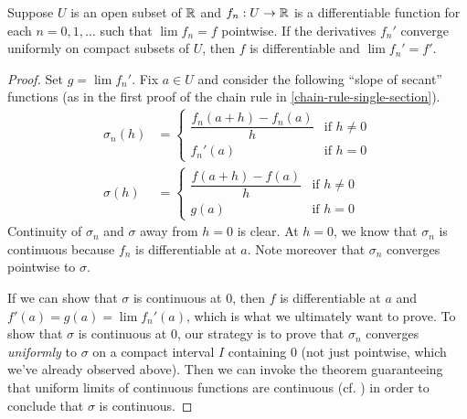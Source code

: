 \begin{theorem} \label{differentiation-uniform-limit}
	Suppose $U$ is an open subset of $\mathbb{R}$ and $f_n : U \to \mathbb{R}$ is a differentiable function for each $n = 0, 1, \dotsc$ such that $\lim f_n = f$ pointwise. If the derivatives $f_n'$ converge uniformly on compact subsets of $U$, then $f$ is differentiable and $\lim f_n' = f'$. 
\end{theorem}

\begin{proof}
	Set $g = \lim f_n'$. Fix $a \in U$ and consider the following ``slope of secant'' functions (as in the first proof of the chain rule in \cref{chain-rule-single-section}). 
	\[ \begin{aligned} \sigma_n(h) &= \begin{cases} \dfrac{f_n(a+h) - f_n(a)}{h} & \text{if } h  \neq 0 \\ f_n'(a) & \text{if } h = 0 \end{cases} \\ 
	\sigma(h) &= \begin{cases} \dfrac{f(a+h) - f(a)}{h} & \text{if } h  \neq 0 \\ g(a) & \text{if } h = 0 \end{cases} \end{aligned} \]
	Continuity of $\sigma_n$ and $\sigma$ away from $h = 0$ is clear. At $h = 0$, we know that $\sigma_n$ is continuous because $f_n$ is differentiable at $a$. Note moreover that $\sigma_n$ converges pointwise to $\sigma$. 
	
	If we can show that $\sigma$ is continuous at $0$, then $f$ is differentiable at $a$ and $f'(a) = g(a) = \lim f_n'(a)$, which is what we ultimately want to prove. To show that $\sigma$ is continuous at 0, our strategy is to prove that $\sigma_n$ converges \emph{uniformly} to $\sigma$ on a compact interval $I$ containing 0 (not just pointwise, which we've already observed above). Then we can invoke the theorem guaranteeing that uniform limits of continuous functions are continuous (cf. \cite[theorem 9.13]{protter-morrey}) in order to conclude that $\sigma$ is continuous.
	

\end{proof}
